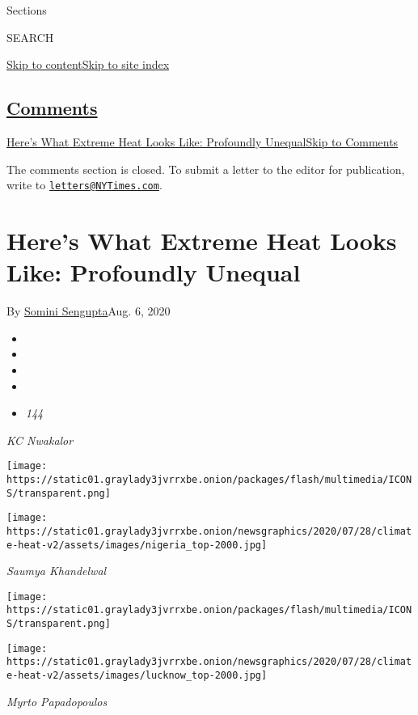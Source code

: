 Sections

SEARCH

\protect\hyperlink{site-content}{Skip to
content}\protect\hyperlink{site-index}{Skip to site index}

\hypertarget{comments}{%
\subsection{\texorpdfstring{\protect\hyperlink{commentsContainer}{Comments}}{Comments}}\label{comments}}

\href{}{Here's What Extreme Heat Looks Like: Profoundly
Unequal}\href{}{Skip to Comments}

The comments section is closed. To submit a letter to the editor for
publication, write to
\href{mailto:letters@NYTimes.com}{\nolinkurl{letters@NYTimes.com}}.

\hypertarget{heres-what-extreme-heat-looks-like-profoundly-unequal}{%
\section{Here's What Extreme Heat Looks Like: Profoundly
Unequal}\label{heres-what-extreme-heat-looks-like-profoundly-unequal}}

By \href{https://www.nytimes3xbfgragh.onion/by/somini-sengupta}{Somini
Sengupta}Aug. 6, 2020

\begin{itemize}
\item
\item
\item
\item
\item
  \emph{144}
\end{itemize}

\emph{KC Nwakalor}

\texttt{[image: https://static01.graylady3jvrrxbe.onion/packages/flash/multimedia/ICONS/transparent.png]}

\texttt{[image: https://static01.graylady3jvrrxbe.onion/newsgraphics/2020/07/28/climate-heat-v2/assets/images/nigeria\_top-2000.jpg]}

\emph{Saumya Khandelwal}

\texttt{[image: https://static01.graylady3jvrrxbe.onion/packages/flash/multimedia/ICONS/transparent.png]}

\texttt{[image: https://static01.graylady3jvrrxbe.onion/newsgraphics/2020/07/28/climate-heat-v2/assets/images/lucknow\_top-2000.jpg]}

\emph{Myrto Papadopoulos}


